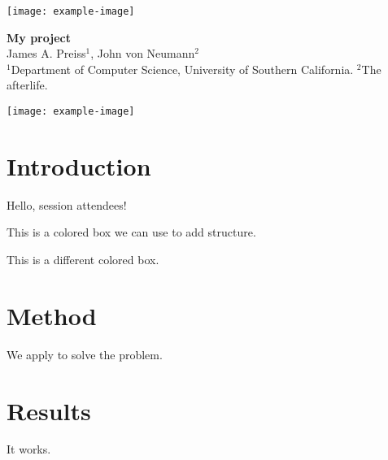 \documentclass[a1,portrait]{a0poster}
\begin{document}
\large


\begin{minipage}[c]{0.12\linewidth}
    \texttt{[image: example-image]}
\end{minipage}
\hfill
\begin{minipage}[c]{0.74\linewidth}
    \centering
    \textbf{\LARGE
        My project
    }\\[0.5cm]
    \Large James A. Preiss$^1$, \; John von Neumann$^2$ \\[0.3cm]
    \large $^1$Department of Computer Science, University of Southern California.  \; $^2$The afterlife.
\end{minipage}
\hfill
\begin{minipage}[c]{0.12\linewidth}
    \texttt{[image: example-image]}
\end{minipage}

\begin{multicols}{2}

\section*{Introduction}
Hello, session attendees!

\vspace{4mm}
{\centering
    \begin{bluebox}[Box 1 title, width=0.92\linewidth]
        This is a colored box we can use to add structure.
    \end{bluebox}
}

{\centering
    \begin{orangebox}[Box 2 title, width=0.92\linewidth]
        This is a different colored box.
    \end{orangebox}%
}

\section*{Method}
We apply \cite{article-full} to solve the problem.

\section*{Results}
It works.

\small



\end{multicols}
\end{document}
